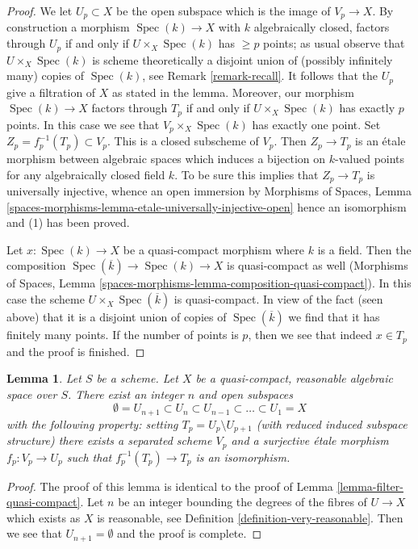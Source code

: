 \documentclass{stacks-project}
\theoremstyle{plain}
\newtheorem{lemma}[subsection]{Lemma}
\theoremstyle{definition}
\theoremstyle{remark}
\numberwithin{equation}{subsection}
\def\Spec{\mathop{\mathrm{Spec}}}
\begin{document}
\begin{proof}
\medskip\noindent
We let $U_p \subset X$ be the open subspace which is the
image of $V_p \to X$. By construction a morphism $\Spec(k) \to X$ with
$k$ algebraically closed, factors through $U_p$ if and only if
$U \times_X \Spec(k)$ has $\geq p$ points; as usual observe that
$U \times_X \Spec(k)$ is scheme theoretically a disjoint union of
(possibly infinitely many) copies of $\Spec(k)$, see
Remark \ref{remark-recall}. It follows that
the $U_p$ give a filtration of $X$ as stated in the lemma.
Moreover, our morphism $\Spec(k) \to X$ factors through $T_p$
if and only if $U \times_X \Spec(k)$ has exactly $p$ points.
In this case we see that $V_p \times_X \Spec(k)$ has exactly one point.
Set $Z_p = f_p^{-1}(T_p) \subset V_p$. This is a closed subscheme of $V_p$.
Then $Z_p \to T_p$ is an \'etale morphism between
algebraic spaces which induces a bijection on $k$-valued
points for any algebraically closed field $k$. To be sure this
implies that $Z_p \to T_p$ is universally injective, whence an
open immersion by
Morphisms of Spaces, Lemma
\ref{spaces-morphisms-lemma-etale-universally-injective-open}
hence an isomorphism and (1) has been proved.

\medskip\noindent
Let $x : \Spec(k) \to X$ be a quasi-compact morphism where $k$ is a field.
Then the composition $\Spec(\overline{k}) \to \Spec(k) \to X$ is quasi-compact
as well (Morphisms of Spaces, Lemma
\ref{spaces-morphisms-lemma-composition-quasi-compact}).
In this case the scheme $U \times_X \Spec(\overline{k})$ is
quasi-compact. In view of the fact (seen above) that it is a disjoint union
of copies of $\Spec(\overline{k})$ we find that it has finitely many points.
If the number of points is $p$, then we see that indeed $x \in T_p$ and
the proof is finished.
\end{proof}

\begin{lemma}
\label{lemma-filter-reasonable}
Let $S$ be a scheme. Let $X$ be a quasi-compact, reasonable algebraic space
over $S$. There exist an integer $n$ and open subspaces
$$
\emptyset = U_{n + 1} \subset
U_n \subset U_{n - 1} \subset \ldots \subset U_1 = X
$$
with the following property: setting $T_p = U_p \setminus U_{p + 1}$
(with reduced induced subspace structure) there exists a separated scheme
$V_p$ and a surjective \'etale morphism $f_p : V_p \to U_p$ such that
$f_p^{-1}(T_p) \to T_p$ is an isomorphism.
\end{lemma}

\begin{proof}
The proof of this lemma is identical to the proof of
Lemma \ref{lemma-filter-quasi-compact}.
Let $n$ be an integer bounding the degrees of
the fibres of $U \to X$ which exists as $X$ is reasonable, see
Definition \ref{definition-very-reasonable}.
Then we see that $U_{n + 1} = \emptyset$ and the proof is complete.
\end{proof}
\end{document}
